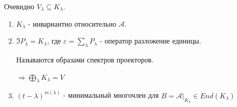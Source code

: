 Очевидно $V_{\lambda}\subseteq K_{\lambda}$.

\begin{enumerate}
    \item $K_{\lambda}$ - инвариантно относительно $\mathcal{A}$.
    \item $\Im P_{\lambda} = K_{\lambda}$, где $\varepsilon = \sum\limits_{\lambda}P_{\lambda}$ - оператор разложение единицы.

    Называются образами спектров проекторов.

    $\Rightarrow \bigoplus\limits_{\lambda} K_{\lambda} = V$

    \item $(t-\lambda)^{m(\lambda)}$ - минимальный многочлен для $B = \mathcal{A}\Big|_{K_{\lambda}}\in End(K_{\lambda})$
\end{enumerate}

